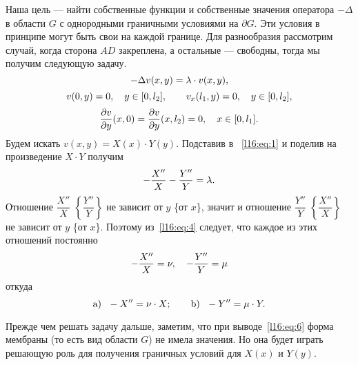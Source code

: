\documentclass[12pt,a4paper,openany,fleqn]{book}
\newcommand{\pder}[2]{\ensuremath{\frac{\partial#1}{\partial#2}}}
\theoremstyle{definition}
\begin{document}
	Наша цель --- найти собственные функции и собственные значения оператора $-\Delta$ в области $G$ с однородными граничными условиями на $\partial G$. Эти условия в принципе могут быть свои на каждой границе. Для разнообразия рассмотрим случай, когда сторона $AD$ закреплена, а остальные --- свободны, тогда мы получим следующую задачу.
	\begin{equation}\label{l16:eq:1}
		\hfill-\Delta v(x,y)=\lambda\cdot v(x,y),\hfill
	\end{equation}  
	\begin{equation}\label{l16:eq:2}
		\hfill v(0,y)=0,\quad y\in[0,l_2],\qquad v_x(l_1,y)=0,\quad y\in[0,l_2],\hfill
	\end{equation}
	\begin{equation}\label{l16:eq:3}
		\hfill \pder{v}{y}(x,0)=\pder{v}{y}(x,l_2)=0,\quad  x\in[0,l_1].\hfill
	\end{equation}
	Будем искать $v(x,y)=X(x)\cdot Y(y)$. Подставив в ~\eqref{l16:eq:1} и поделив на произведение $X\cdot Y$ получим 
	\begin{equation}\label{l16:eq:4}
		\hfill-\frac{X''}{X}-\frac{Y''}{Y}=\lambda.\hfill
	\end{equation}
	Отношение $\dfrac{X''}{X}$ $\left\{\dfrac{Y''}{Y}\right\}$ не зависит от $y$ \{от $x$\}, значит и отношение $\dfrac{Y''}{Y}$ $\left\{\dfrac{X''}{X}\right\}$ не зависит от $y$ \{от $x$\}. Поэтому из~\eqref{l16:eq:4} следует, что каждое из этих отношений постоянно
	\begin{equation}\label{l16:eq:5}
		\hfill-\frac{X''}{X}=\nu,\quad-\frac{Y''}{Y}=\mu\hfill
	\end{equation} 
	откуда
	\begin{equation}\label{l16:eq:6}
		\hfill\text{a)}\ \ -X''=\nu\cdot X;\qquad\text{b)}\ \ -Y''=\mu\cdot Y.\hfill
	\end{equation}
	
	Прежде чем решать задачу дальше, заметим, что при выводе~\eqref{l16:eq:6} форма мембраны (то есть вид области $G$) не имела значения. Но она будет играть решающую роль для получения граничных условий для $X(x)$ и $Y(y)$.
	
\end{document}
